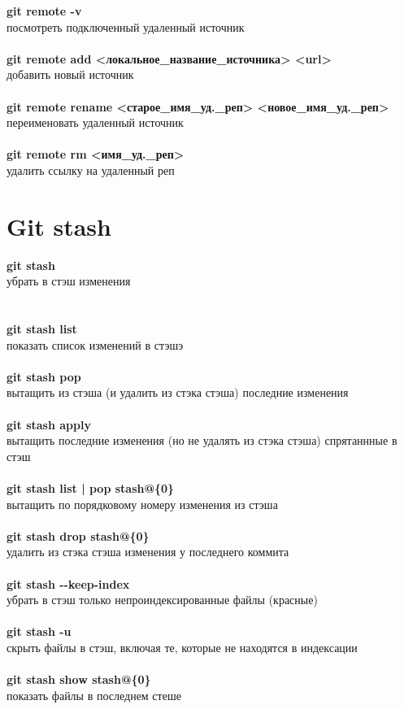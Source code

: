 \documentclass[a4paper, 12px]{report}
\begin{document}
\textbf{git remote -v}\\посмотреть подключенный удаленный источник\\\\
\textbf{git remote add <локальное\_название\_источника> <url>}\\добавить новый источник\\\\
\textbf{git remote rename <старое\_имя\_уд.\_реп> <новое\_имя\_уд.\_реп>}\\переименовать удаленный источник\\\\
\textbf{git remote rm <имя\_уд.\_реп>}\\удалить ссылку на удаленный реп

\section{Git stash}

\textbf{git stash}\\убрать в стэш изменения\\\\\\
\textbf{git stash list}\\показать список изменений в стэшэ\\\\
\textbf{git stash pop}\\вытащить из стэша (и удалить из стэка стэша) последние изменения\\\\
\textbf{git stash apply}\\вытащить последние изменения (но не удалять из стэка стэша) спрятаннные в стэш\\\\
\textbf{git stash list | pop stash@\{0\}}\\вытащить по порядковому номеру изменения из стэша\\\\
\textbf{git stash drop stash@\{0\}}\\удалить из стэка стэша изменения у последнего коммита\\\\
\textbf{git stash -\--keep-index}\\убрать в стэш только непроиндексированные файлы (красные)\\\\
\textbf{git stash -u}\\скрыть файлы в стэш, включая те, которые не находятся в индексации\\\\
\textbf{git stash show stash@\{0\}}\\
показать файлы в последнем стеше
\end{document}
